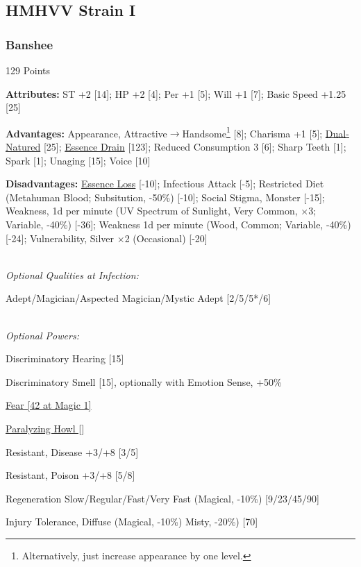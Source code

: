 \begin{multicols*}{3}
	
	\subsection*{HMHVV Strain I}
	
	\subsubsection{Banshee}\label{banshee}
	\begin{flushright}
		129 Points
	\end{flushright}
	
	\textbf{Attributes:}
	ST +2 [14]; HP +2 [4]; Per +1 [5]; Will +1 [7]; Basic Speed +1.25 [25]
	
	\textbf{Advantages:}
	Appearance, Attractive$\rightarrow$Handsome\footnote{Alternatively, just increase appearance by one level.} [8]; Charisma +1 [5]; \hyperref[dual_natured]{Dual-Natured} [25]; \hyperref[essence_drain]{Essence Drain} [123]; Reduced Consumption 3 [6]; Sharp Teeth [1]; Spark [1]; Unaging [15]; Voice [10]
	
	\textbf{Disadvantages:}	
	\hyperref[essence_loss]{Essence Loss} [-10]; Infectious Attack [-5]; Restricted Diet (Metahuman Blood; Subsitution, -50\%) [-10]; Social Stigma, Monster [-15]; Weakness, 1d per minute (UV Spectrum of Sunlight, Very Common, $\times$3; Variable, -40\%) [-36]; Weakness 1d per minute (Wood, Common; Variable, -40\%) [-24]; Vulnerability, Silver $\times$2 (Occasional) [-20]
	
	\textit{\\Optional Qualities at Infection:}
	
	Adept/Magician/Aspected Magician/Mystic Adept [2/5/5*/6]
	
	\textit{\\Optional Powers:}
	
	Discriminatory Hearing [15]
	
	Discriminatory Smell [15], optionally with Emotion Sense, +50\%
	
	\hyperref[fear]{Fear [42 at Magic 1]}
	
	\hyperref[paralyzing_howl]{Paralyzing Howl []}
	
	Resistant, Disease +3/+8 [3/5]
	
	Resistant, Poison +3/+8 [5/8]
	
	Regeneration Slow/Regular/Fast/Very Fast (Magical, -10\%) [9/23/45/90]
	
	Injury Tolerance, Diffuse (Magical, -10\%) Misty, -20\%) [70]
	

\end{multicols*}
